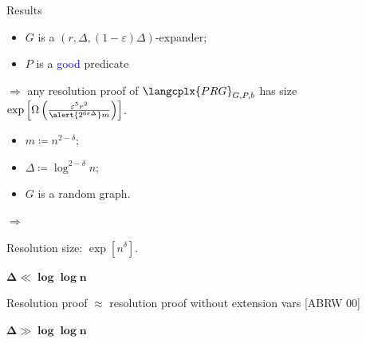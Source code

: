 \begin{frame}{Results}

    \begin{theorem}
        \begin{itemize}
            \item $G$ is a $(r, \Delta, (1 - \varepsilon) \Delta)$-expander;
            \item $P$ is a \textcolor{blue}{good} predicate
        \end{itemize}
        $\Rightarrow$ any resolution proof of $\langcplx{PRG}_{G, P, b}$ has size
        $\exp\left[\Omega\left( \frac{\varepsilon^5 r^2}{\alert{2^{6 \varepsilon \Delta}} m} \right) \right]$.
    \end{theorem}

    \pause

    \begin{minipage}{0.4\linewidth}
        \begin{itemize}
            \item $m \coloneqq n^{2 - \delta}$;
            \item $\Delta \coloneqq \log^{2 - \delta} n$;
            \item $G$ is a random graph.
        \end{itemize}
    \end{minipage}
    \begin{minipage}{0.1\linewidth}
        $\Rightarrow$
    \end{minipage}
    \begin{minipage}{0.4\linewidth}
        Resolution size: $\exp[n^{\delta}]$.
    \end{minipage}

    \pause
    \vspace{0.4cm}
    \begin{minipage}[t][1cm][t]{0.48\linewidth}
        \centering
        $\mathbf{\Delta \ll \log\log n}$
        
        \pause
        \vspace{0.2cm}
        Resolution proof $\approx$ resolution proof without extension vars [ABRW 00]
    \end{minipage}
    \pause
    \begin{minipage}[t][3cm][t]{0.48\linewidth}
        \centering
        $\mathbf{\Delta \gg \log \log n}$


\end{minipage}
\end{frame}
